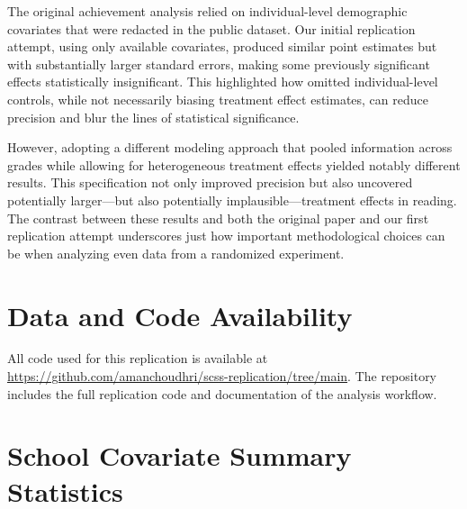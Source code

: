 \documentclass[11pt]{article}
\begin{document}
The original achievement analysis relied on individual-level demographic
covariates that were redacted in the public dataset. Our initial replication
attempt, using only available covariates, produced similar point estimates but
with substantially larger standard errors, making some previously significant
effects statistically insignificant. This highlighted how omitted
individual-level controls, while not necessarily biasing treatment effect
estimates, can reduce precision and blur the lines of statistical significance.

However, adopting a different modeling approach that pooled information
across grades while allowing for heterogeneous treatment effects yielded
notably different results. This specification not only improved precision but
also uncovered potentially larger—but also potentially implausible—treatment
effects in reading. The contrast between these results and both the original paper and our first
replication attempt underscores just how important methodological choices can be when
analyzing even data from a randomized experiment.

\section*{Data and Code Availability}
All code used for this replication is available at
\url{https://github.com/amanchoudhri/scss-replication/tree/main}. The
repository includes the full replication code and documentation of the analysis
workflow.

\printbibliography

\appendix

\section{School Covariate Summary Statistics}


\end{document}
